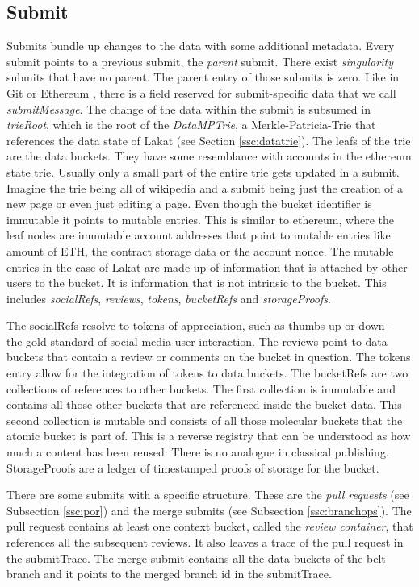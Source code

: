\subsection{Submit}
\label{ssc:submit}
Submits bundle up changes to the data with some additional metadata. Every submit points to a previous submit, the \textit{parent} submit. There exist \textit{singularity} submits that have no parent. The parent entry of those submits is zero. Like in Git \cite{chacon2014pro} or Ethereum \cite{buterin2013ethereum}, there is a field reserved for submit-specific data that we call \textit{submitMessage}. The change of the data within the submit is subsumed in \textit{trieRoot}, which is the root of the \textit{DataMPTrie}, a Merkle-Patricia-Trie that references the data state of Lakat (see Section \ref{ssc:datatrie}). The leafs of the trie are the data buckets. They have some resemblance with accounts in the ethereum state trie. Usually only a small part of the entire trie gets updated in a submit. Imagine the trie being all of wikipedia and a submit being just the creation of a new page or even just editing a page. Even though the bucket identifier is immutable it points to mutable entries. This is similar to ethereum, where the leaf nodes are immutable account addresses that point to mutable entries like amount of ETH, the contract storage data or the account nonce. The mutable entries in the case of Lakat are made up of information that is attached by other users to the bucket. It is information that is not intrinsic to the bucket. This includes \textit{socialRefs}, \textit{reviews}, \textit{tokens}, \textit{bucketRefs} and \textit{storageProofs}. 

The socialRefs resolve to tokens of appreciation, such as thumbs up or down -- the gold standard of social media user interaction. The reviews point to data buckets that contain a review or comments on the bucket in question. The tokens entry allow for the integration of tokens to data buckets. The bucketRefs are two collections of references to other buckets. The first collection is immutable and contains all those other buckets that are referenced inside the bucket data. This second collection is mutable and consists of all those molecular buckets that the atomic bucket is part of. This is a reverse registry that can be understood as how much a content has been reused. There is no analogue in classical publishing. StorageProofs are a ledger of timestamped proofs of storage for the bucket.  

There are some submits with a specific structure. These are the \textit{pull requests} (see Subsection \ref{ssc:por}) and the merge submits (see Subsection \ref{ssc:branchops}). The pull request  contains at least one context bucket, called the \textit{review container}, that references all the subsequent reviews. It also leaves a trace of the pull request in the submitTrace. The merge submit contains 
all the data buckets of the belt branch and it points to the merged branch id in the submitTrace. 

